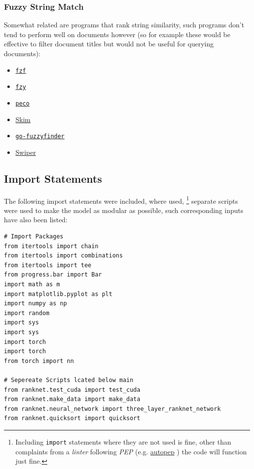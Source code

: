 \documentclass[a4paper,11pt,twoside]{article}
\begin{document}
\subsubsection{Fuzzy String Match}
\label{sec:org885af02}
Somewhat related are programs that rank string similarity, such programs don't tend
to perform well on documents however (so for example these would
be effective to filter document titles but would not be useful for
querying documents):

\begin{itemize}
\item \href{https://github.com/junegunn/fzf}{\texttt{fzf}} \cite{choiJunegunnFzf2021}
\item \href{https://github.com/jhawthorn/fzy}{\texttt{fzy}} \cite{hawthornJhawthornFzy2021}
\item \href{https://github.com/peco/peco}{\texttt{peco}} \cite{lestrratPecoPeco2021}
\item \href{https://github.com/lotabout/skim}{Skim} \cite{zhangLotaboutSkim2021}
\item \href{https://github.com/lotabout/skim}{\texttt{go-fuzzyfinder}} \cite{ktrKtr0731Gofuzzyfinder2021}
\item \href{https://github.com/lotabout/skim}{Swiper} \cite{krehelAboaboSwiper2021}
\end{itemize}

\subsection{Import Statements}
\label{sec:org23d9eb7}
The following import statements were included, where used, \footnote{Including \texttt{import} statements where they are not used is fine,
other than complaints from a \emph{linter} following \emph{PEP}
\cite{nickcoghlanPEPStyleGuide2001} (e.g. \href{https://pypi.org/project/autopep8/}{autopep}
\cite{hattoriAutopep8ToolThat}) the code will function just fine.}
separate scripts were used to make the model as modular as possible,
such corresponding inputs have also been listed:

\begin{verbatim}
# Import Packages
from itertools import chain
from itertools import combinations
from itertools import tee
from progress.bar import Bar
import math as m
import matplotlib.pyplot as plt
import numpy as np
import random
import sys
import sys
import torch
import torch
from torch import nn

# Sepereate Scripts lcated below main
from ranknet.test_cuda import test_cuda
from ranknet.make_data import make_data
from ranknet.neural_network import three_layer_ranknet_network
from ranknet.quicksort import quicksort
\end{verbatim}
\end{document}
